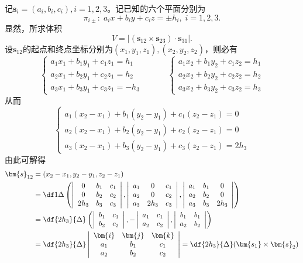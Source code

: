 记$\bm{s}_i=(a_i,b_i,c_i),i=1,2,3$。记已知的六个平面分别为
$$\pi_{i\pm}:\;a_ix+b_iy+c_iz=\pm h_i,\;i=1,2,3.$$
显然，所求体积
$$V=|(\bm{s}_{12}\times\bm{s}_{23})\cdot\bm{s}_{31}|.$$
设$\bm{s}_{12}$的起点和终点坐标分别为$(x_1,y_1,z_1),(x_2,y_2,z_2)$，则必有
$$
	\left\{\begin{array}{l}
		a_1x_1+b_1y_1+c_1z_1=h_1\\
		a_2x_1+b_2y_1+c_2z_1=h_2\\
		a_3x_1+b_3y_1+c_3z_1=-h_3
	\end{array}\right.
	\quad\quad\quad
	\left\{\begin{array}{l}
		a_1x_2+b_1y_2+c_1z_2=h_1\\
		a_2x_2+b_2y_2+c_2z_2=h_2\\
		a_3x_2+b_3y_2+c_3z_2=h_3
	\end{array}\right.
$$
从而
$$
	\left\{\begin{array}{l}
		a_1(x_2-x_1)+b_1(y_2-y_1)+c_1(z_2-z_1)=0\\
		a_2(x_2-x_1)+b_2(y_2-y_1)+c_2(z_2-z_1)=0\\
		a_3(x_2-x_1)+b_3(y_2-y_1)+c_3(z_2-z_1)=2h_3
	\end{array}\right.
$$
由此可解得
\begin{align*}
	\bm{s}_{12}&=(x_2-x_1,y_2-y_1,z_2-z_1)\\
	&=\df1{\Delta}\left(
		\left|\begin{array}{ccc}
			0 & b_1 & c_1\\ 0 & b_2 & c_2 \\ 2h_3 & b_3 & c_3
		\end{array}\right|,
		\left|\begin{array}{ccc}
			a_1 & 0 & c_1\\ a_2 & 0 & c_2 \\ a_3 & 2h_3 & c_3
		\end{array}\right|,
		\left|\begin{array}{ccc}
			a_1 & b_1 & 0\\ a_2 & b_2 & 0 \\ a_3 & b_3 & 2h_3
		\end{array}\right|
	\right)\\
	&=\df{2h_3}{\Delta}\left(
		\left|\begin{array}{cc}
			b_1 & c_1 \\ b_2 & c_2
		\end{array}\right|,
		-\left|\begin{array}{cc}
			a_1 & c_1 \\ a_2 & c_2
		\end{array}\right|,
		\left|\begin{array}{cc}
			b_1 & b_1 \\ a_2 & b_2
		\end{array}\right|
	\right)\\
	&=\df{2h_3}{\Delta}\left|\begin{array}{ccc}
		\bm{i} & \bm{j} & \bm{k} \\
		a_1 & b_1 & c_1 \\
		a_2 & b_2 & c_2
	\end{array}\right|
	=\df{2h_3}{\Delta}(\bm{s_1}\times\bm{s}_2)
\end{align*}
